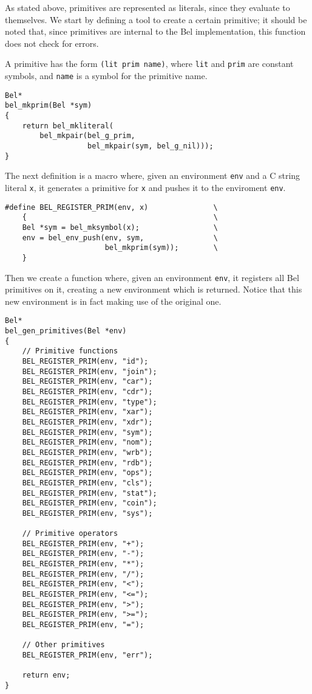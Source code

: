 \documentclass[openright,a4paper,twoside,12pt]{memoir}
\begin{document}
As stated above, primitives are represented as literals, since they
evaluate to themselves. We start by defining a tool to create a
certain primitive; it should be noted that, since primitives are
internal to the Bel implementation, this function does not check for
errors.

A primitive has the form \texttt{(lit prim name)}, where \texttt{lit} and \texttt{prim} are
constant symbols, and \texttt{name} is a symbol for the primitive name.

\begin{verbatim}
Bel*
bel_mkprim(Bel *sym)
{
    return bel_mkliteral(
        bel_mkpair(bel_g_prim,
                   bel_mkpair(sym, bel_g_nil)));
}
\end{verbatim}

The next definition is a macro where, given an environment \texttt{env} and a
C string literal \texttt{x}, it generates a primitive for \texttt{x} and pushes it to
the enviroment \texttt{env}.

\begin{verbatim}
#define BEL_REGISTER_PRIM(env, x)               \
    {                                           \
    Bel *sym = bel_mksymbol(x);                 \
    env = bel_env_push(env, sym,                \
                       bel_mkprim(sym));        \
    }
\end{verbatim}

Then we create a function where, given an environment \texttt{env}, it
registers all Bel primitives on it, creating a new environment which
is returned. Notice that this new environment is in fact making use of
the original one.

\begin{verbatim}
Bel*
bel_gen_primitives(Bel *env)
{
    // Primitive functions
    BEL_REGISTER_PRIM(env, "id");
    BEL_REGISTER_PRIM(env, "join");
    BEL_REGISTER_PRIM(env, "car");
    BEL_REGISTER_PRIM(env, "cdr");
    BEL_REGISTER_PRIM(env, "type");
    BEL_REGISTER_PRIM(env, "xar");
    BEL_REGISTER_PRIM(env, "xdr");
    BEL_REGISTER_PRIM(env, "sym");
    BEL_REGISTER_PRIM(env, "nom");
    BEL_REGISTER_PRIM(env, "wrb");
    BEL_REGISTER_PRIM(env, "rdb");
    BEL_REGISTER_PRIM(env, "ops");
    BEL_REGISTER_PRIM(env, "cls");
    BEL_REGISTER_PRIM(env, "stat");
    BEL_REGISTER_PRIM(env, "coin");
    BEL_REGISTER_PRIM(env, "sys");

    // Primitive operators
    BEL_REGISTER_PRIM(env, "+");
    BEL_REGISTER_PRIM(env, "-");
    BEL_REGISTER_PRIM(env, "*");
    BEL_REGISTER_PRIM(env, "/");
    BEL_REGISTER_PRIM(env, "<");
    BEL_REGISTER_PRIM(env, "<=");
    BEL_REGISTER_PRIM(env, ">");
    BEL_REGISTER_PRIM(env, ">=");
    BEL_REGISTER_PRIM(env, "=");

    // Other primitives
    BEL_REGISTER_PRIM(env, "err");
    
    return env;
}
\end{verbatim}
\end{document}

